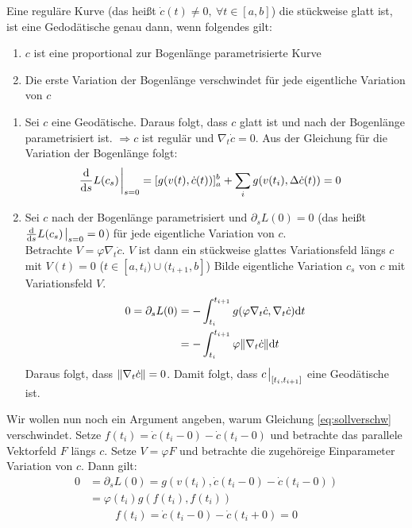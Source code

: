 \begin{satz}
    Eine reguläre Kurve (das heißt $\dot{c}(t)\neq 0, \ \forall t \in [a, b]$) die stückweise glatt ist, ist eine Gedodätische genau dann, wenn folgendes gilt:
    \begin{enumerate}
    \item $c$ ist eine proportional zur Bogenlänge parametrisierte Kurve
    \item Die erste Variation der Bogenlänge verschwindet für jede eigentliche Variation von $c$
    \end{enumerate}
    
\end{satz}
\begin{bew}
    \begin{enumerate}
        \item Sei $c$ eine Geodätische.
            Daraus folgt, dass $c$ glatt ist und nach der Bogenlänge parametrisiert ist. 
            $\Rightarrow c$ ist regulär und $\nabla_t \dot{c} = 0$. 
            Aus der Gleichung für die Variation der Bogenlänge folgt:
            \begin{align*}
                &\dv{s}L(c_s)\eval_{s = 0} = [g(v(t), \dot{c}(t))]^b_a + \sum_i g(v(t_i), \Delta \dot{c}(t)) = 0
            \end{align*}
        \item Sei $c$ nach der Bogenlänge parametrisiert und $\partial_s L (0) = 0$ (das heißt $\dv{s}L(c_s)\eval_{s=0} = 0$) für jede eigentliche Variation von $c$.\\
            Betrachte $V = \varphi \nabla_t \dot{c}$.
            $V$ ist dann ein stückweise glattes Variationsfeld längs $c$ mit $V(t)=0$ ($t\in [a, t_i) \cup (t_{i + 1}, b]$)
            Bilde eigentliche Variation $c_s$ von $c$ mit Variationsfeld $V$.
            \begin{align}
                \label{eq:sollverschw}
                0 = \partial_s L(0) &= - \int^{t_{i + 1}}_{t_i} g(\varphi \nabla_t \dot{c}, \nabla_t \dot{c}) \dd t\\
                &= - \int^{t_{i+1}}_{t_i} \varphi \norm{\nabla_t \dot{c}} \dd t
            \end{align}
Daraus folgt, dass $\norm{\nabla_t \dot{c}} = 0$.
Damit folgt, dass $c\eval_{[t_i, t_{i+1} ]}$ eine Geodätische ist.
    \end{enumerate}
    Wir wollen nun noch ein Argument angeben, warum Gleichung \ref{eq:sollverschw} verschwindet.
    Setze $f(t_i) = \dot{c}(t_i - 0) - \dot{c}(t_i - 0)$ und betrachte das parallele Vektorfeld $F$ längs $c$.
    Setze $V = \varphi F $ und betrachte die zugehöreige Einparameter Variation von $c$.
    Dann gilt:
    \begin{align*}
        0 &= \partial_s L(0) = g(v(t_i), \dot{c}(t_i - 0) - \dot{c}(t_i - 0))\\
        &= \varphi(t_i) g(f(t_i), f(t_i))
    \end{align*}
\begin{align}
    f(t_i) = \dot{c}(t_i - 0) - \dot{c}(t_i + 0) = 0
\end{align}
\end{bew}
